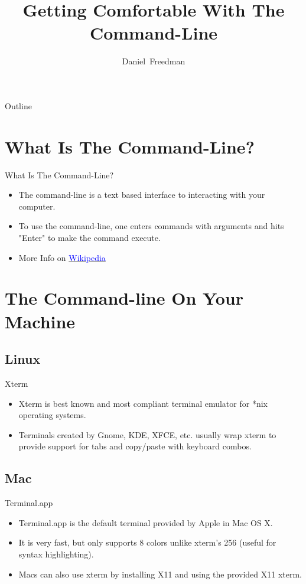 \documentclass[10pt]{beamer}
\title[Getting Comfortable With The Command-Line]
{Getting Comfortable With The Command-Line}
\author[ACM Student Lecture Series]{Daniel~Freedman}
\date[September 14th, 2010]
\begin{document}
\begin{frame}
  \titlepage
\end{frame}

\begin{frame}[shrink]{Outline}
  \tableofcontents
\end{frame}

\section{What Is The Command-Line?}
\begin{frame}{What Is The Command-Line?}
  \begin{itemize}
  \item The command-line is a text based interface to interacting with your computer.
  \item To use the command-line, one enters commands with arguments and hits "Enter" to make the command execute.
  \item More Info on \href{http://en.wikipedia.org/wiki/Command-line\_interface}{\textcolor{blue}{Wikipedia}}
  \end{itemize}
\end{frame}

\section{The Command-line On Your Machine}

\subsection{Linux}
\begin{frame}{Xterm}
\begin{itemize}
\item Xterm is best known and most compliant terminal emulator for *nix operating systems.
\item Terminals created by Gnome, KDE, XFCE, etc. usually wrap xterm to provide support for tabs and copy/paste with keyboard combos.
\end{itemize}
\end{frame}

\subsection{Mac}
\begin{frame}{Terminal.app}
\begin{itemize}
\item Terminal.app is the default terminal provided by Apple in Mac OS X.
\item It is very fast, but only supports 8 colors unlike xterm's 256 (useful for syntax highlighting).
\item Macs can also use xterm by installing X11 and using the provided X11 xterm.
\end{itemize}
\end{frame}
\end{document}
